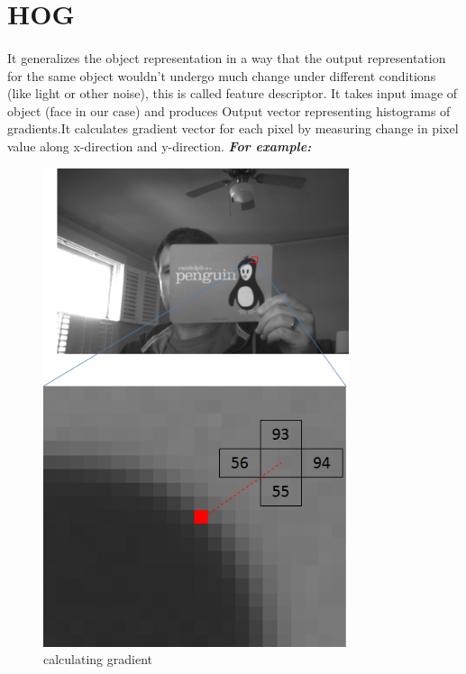 \section{HOG}
\paragraph{}It generalizes the object representation in a way that the output representation for the same object wouldn’t undergo much change under different conditions (like light or other noise), this is called feature descriptor.
It takes input image of object (face in our case) and produces Output vector representing histograms of gradients.\newline It calculates gradient vector for each pixel by measuring change in pixel value along x-direction and y-direction. \newline \newline \textbf{\textit{For example:}} \newline
\begin{figure}
    \centering
	\includegraphics[width=0.80\textwidth]{hog_pixel_ex.png}
	\caption{calculating gradient}
	\label{fig:calculating gradient}
\end{figure}
